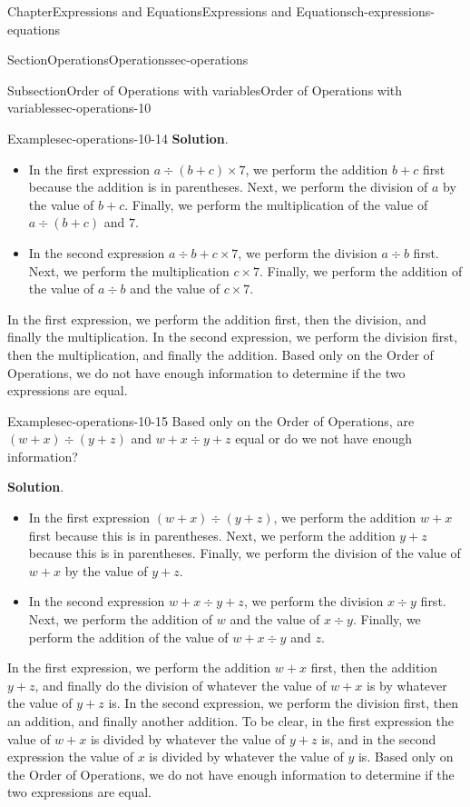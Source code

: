\documentclass[twoside,11pt,]{book}
\newcommand{\blocktitlefont}{\relax}
\numberwithin{equation}{chapter}
\begin{document}
\begin{chapterptx}{Chapter}{Expressions and Equations}{}{Expressions and Equations}{}{}{ch-expressions-equations}
\begin{sectionptx}{Section}{Operations}{}{Operations}{}{}{sec-operations}
\begin{subsectionptx}{Subsection}{Order of Operations with variables}{}{Order of Operations with variables}{}{}{sec-operations-10}
\begin{example}{Example}{}{sec-operations-10-14}
\noindent\textbf{\blocktitlefont Solution}.\hypertarget{sec-operations-10-14-2}{}\quad{}%
\begin{itemize}[label=\textbullet]
\item{}In the first expression \(a \div (b+c) \times 7\), we perform the addition \(b+c\) first because the addition is in parentheses. Next, we perform the division of \(a\) by the value of \(b+c\). Finally, we perform the multiplication of the value of \(a \div (b+c)\) and \(7\).%
\item{}In the second expression \(a \div b + c \times 7\), we perform the division \(a \div b\) first. Next, we perform the multiplication \(c \times 7\). Finally, we perform the addition of the value of \(a \div b\) and the value of \(c \times 7\).%
\end{itemize}
In the first expression, we perform the addition first, then the division, and finally the multiplication. In the second expression, we perform the division first, then the multiplication, and finally the addition. Based only on the Order of Operations, we do not have enough information to determine if the two expressions are equal.%
\end{example}
\begin{example}{Example}{}{sec-operations-10-15}%
Based only on the Order of Operations, are \((w + x) \div (y + z)\) and \(w + x \div y + z\) equal or do we not have enough information?%
\par\smallskip%
\noindent\textbf{\blocktitlefont Solution}.\hypertarget{sec-operations-10-15-2}{}\quad{}%
\begin{itemize}[label=\textbullet]
\item{}In the first expression \((w + x) \div (y + z)\), we perform the addition \(w + x\) first because this is in parentheses. Next, we perform the addition \(y + z\) because this is in parentheses. Finally, we perform the division of the value of \(w + x\) by the value of \(y + z\).%
\item{}In the second expression \(w + x \div y + z\), we perform the division \(x \div y\) first. Next, we perform the addition of \(w\) and the value of \(x \div y\). Finally, we perform the addition of the value of \(w + x \div y\) and \(z\).%
\end{itemize}
In the first expression, we perform the addition \(w + x\) first, then the addition \(y + z\), and finally do the division of whatever the value of \(w+x\) is by whatever the value of \(y+z\) is. In the second expression, we perform the division first, then an addition, and finally another addition. To be clear, in the first expression the value of \(w+x\) is divided by whatever the value of \(y+z\) is, and in the second expression the value of \(x\) is divided by whatever the value of \(y\) is. Based only on the Order of Operations, we do not have enough information to determine if the two expressions are equal.%

\end{example}
\end{subsectionptx}
\end{sectionptx}
\end{chapterptx}
\end{document}
